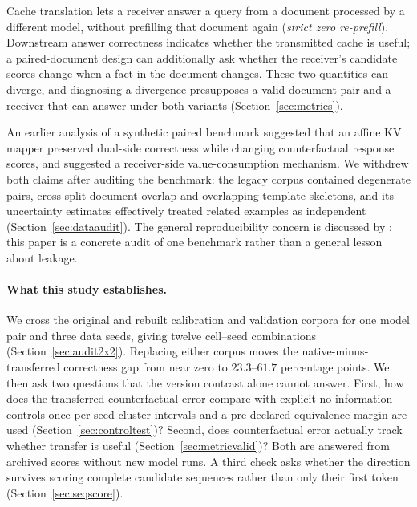 \documentclass[11pt,twocolumn]{article}
\begin{document}
Cache translation lets a receiver answer a query from a document processed by
a different model, without prefilling that document again (\emph{strict zero
re-prefill}). Downstream answer correctness indicates whether the transmitted
cache is useful; a paired-document design can additionally ask whether the
receiver's candidate scores change when a fact in the document changes. These
two quantities can diverge, and diagnosing a divergence presupposes a valid
document pair and a receiver that can answer under both variants
(Section~\ref{sec:metrics}).

An earlier analysis of a synthetic paired benchmark suggested that an affine
KV mapper preserved dual-side correctness while changing counterfactual
response scores, and suggested a receiver-side value-consumption mechanism. We
withdrew both claims after auditing the benchmark: the legacy corpus contained
degenerate pairs, cross-split document overlap and overlapping template
skeletons, and its uncertainty estimates effectively treated related examples
as independent (Section~\ref{sec:dataaudit}). The general reproducibility
concern is discussed by \citet{kapoor2023}; this paper is a concrete audit of
one benchmark rather than a general lesson about leakage.

\paragraph{What this study establishes.}
We cross the original and rebuilt calibration and validation corpora for one
model pair and three data seeds, giving twelve cell--seed combinations
(Section~\ref{sec:audit2x2}). Replacing either corpus moves the native-minus-
transferred correctness gap from near zero to $23.3$--$61.7$ percentage
points. We then ask two questions that the version contrast alone cannot
answer. First, how does the transferred counterfactual error compare with
explicit no-information controls once per-seed cluster intervals and a
pre-declared equivalence margin are used (Section~\ref{sec:controltest})?
Second, does counterfactual error actually track whether transfer is useful
(Section~\ref{sec:metricvalid})? Both are answered from archived scores
without new model runs. A third check asks whether the direction survives
scoring complete candidate sequences rather than only their first token
(Section~\ref{sec:seqscore}).
\end{document}
